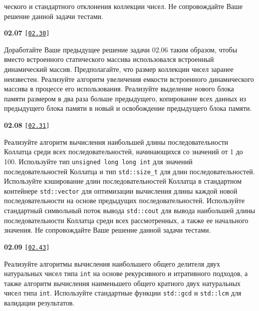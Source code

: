 \documentclass[a4paper,12pt]{article}
\begin{document}
ческого и стандартного отклонения коллекции чисел. Не сопровождайте Ваше решение данной задачи тестами.

\bigskip

{\large \textbf{02.07} \texttt{[\href{https://github.com/i-s-m-mipt/Education/blob/master/projects/examples/source/02.30.cpp}{\texttt{02.30}}]}}

\bigskip

Доработайте Ваше предыдущее решение задачи 02.06 таким образом, чтобы вместо встроенного статического массива использовался встроенный динамический массив. Предполагайте, что размер коллекции чисел заранее неизвестен. Реализуйте алгоритм увеличения емкости встроенного динамического массива в процессе его использования. Реализуйте выделение нового блока памяти размером в два раза больше предыдущего, копирование всех данных из предыдущего блока памяти в новый и освобождение предыдущего блока памяти.

\bigskip

{\large \textbf{02.08} \texttt{[\href{https://github.com/i-s-m-mipt/Education/blob/master/projects/examples/source/02.31.cpp}{\texttt{02.31}}]}}

\bigskip

Реализуйте алгоритм вычисления наибольшей длины последовательности Коллатца среди всех последовательностей, начинающихся со значений от 1 до 100. Используйте тип \lstinline{unsigned long long int} для значений последовательностей Коллатца и тип \lstinline{std::size_t} для длин последовательностей. Используйте кэширование длин последовательностей Коллатца в стандартном контейнере \lstinline{std::vector} для оптимизации вычисления длины каждой новой последовательности на основе предыдущих последовательностей. Используйте стандартный символьный поток вывода \lstinline{std::cout} для вывода наибольшей длины последовательности Коллатца среди всех рассмотренных, а также ее начального значения. Не сопровождайте Ваше решение данной задачи тестами.

\bigskip

{\large \textbf{02.09} \texttt{[\href{https://github.com/i-s-m-mipt/Education/blob/master/projects/examples/source/02.43.cpp}{\texttt{02.43}}]}}

\bigskip

Реализуйте алгоритмы вычисления наибольшего общего делителя двух натуральных чисел типа \lstinline{int} на основе рекурсивного и итративного подходов, а также алгоритм вычисления наименьшего общего кратного двух натуральных чисел типа \lstinline{int}. Используйте стандартные функции \lstinline{std::gcd} и \lstinline{std::lcm} для валидации результатов.
\end{document}
